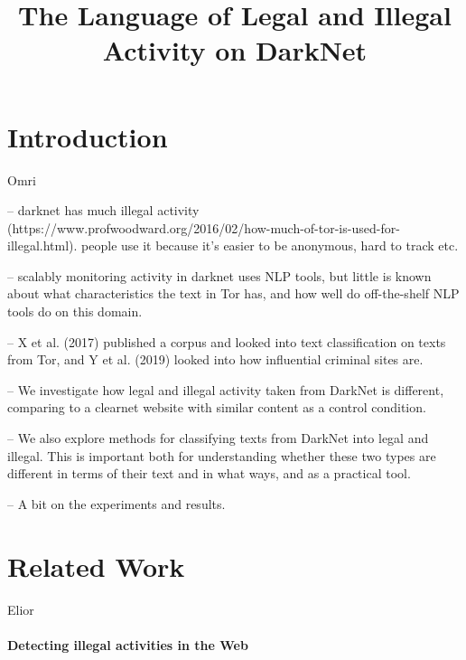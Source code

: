 \documentclass[11pt,a4paper]{article}
\title{The Language of Legal and Illegal Activity on DarkNet}
\date{}
\begin{document}
\maketitle
\begin{abstract}
  
\end{abstract}



\section{Introduction}

Omri

-- darknet has much illegal activity (https://www.profwoodward.org/2016/02/how-much-of-tor-is-used-for-illegal.html). people use it because it's easier to be anonymous, hard to track etc.

-- scalably monitoring activity in darknet uses NLP tools, but little is known about what characteristics the text in Tor has, and how well do off-the-shelf NLP tools do on this domain.

-- X et al. (2017) published a corpus and looked into text classification on texts from Tor, and Y et al. (2019) looked into how influential criminal sites are. 

-- We investigate how legal and illegal activity taken from DarkNet is different, comparing to a clearnet website with similar content as a control condition.

-- We also explore methods for classifying texts from DarkNet into legal and illegal. This is important both for understanding whether these two types are different in terms of
their text and in what ways, and as a practical tool.

-- A bit on the experiments and results.

\section{Related Work}

Elior

\paragraph{Detecting illegal activities in the Web}
\end{document}
